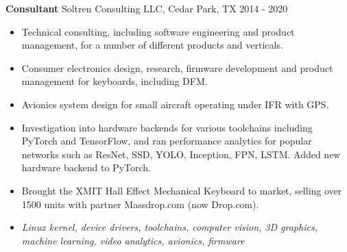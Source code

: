 \textbf{Consultant}
Soltren Consulting LLC, Cedar Park, TX \hfill 2014 - 2020

\begin{itemize} \itemsep -2pt

\item Technical consulting, including software engineering and product management, for a number of different products and verticals.

\item Consumer electronics design, research, firmware development and product management for keyboards, including DFM.

\item Avionics system design for small aircraft operating under IFR with GPS.

\item Investigation into hardware backends for various toolchains including PyTorch and TensorFlow, and ran performance analytics for popular networks such as ResNet, SSD, YOLO, Inception, FPN, LSTM. Added new hardware backend to PyTorch.

\item Brought the XMIT Hall Effect Mechanical Keyboard to market,
      selling over 1500 units with partner Massdrop.com (now Drop.com).

\item \emph{Linux kernel, device drivers, toolchains, computer vision, 3D graphics, machine learning, video analytics, avionics, firmware}

\end{itemize}
